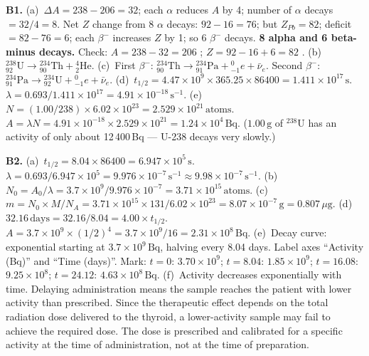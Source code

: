 \textbf{B1.}
(a)~$\Delta A=238-206=32$; each $\alpha$ reduces
$A$ by 4; number of $\alpha$ decays $=32/4=8$.
Net $Z$ change from 8 $\alpha$ decays:
$92-16=76$; but $Z_{Pb}=82$; deficit $=82-76=6$;
each $\beta^-$ increases $Z$ by 1; so 6 $\beta^-$
decays. \textbf{8 alpha and 6 beta-minus decays.}
Check: $A=238-32=206$ \checkmark;
$Z=92-16+6=82$ \checkmark. \quad
(b)~${}^{238}_{92}\text{U}\to
{}^{234}_{90}\text{Th}+{}^{4}_{2}\text{He}$. \quad
(c)~First $\beta^-$:
${}^{234}_{90}\text{Th}\to
{}^{234}_{91}\text{Pa}+{}^{0}_{-1}e+\bar{\nu}_e$.
Second $\beta^-$:
${}^{234}_{91}\text{Pa}\to
{}^{234}_{92}\text{U}+{}^{0}_{-1}e+\bar{\nu}_e$. \quad
(d)~$t_{1/2}=4.47\times10^9\times365.25\times86400
=1.411\times10^{17}\,\text{s}$.
$\lambda=0.693/1.411\times10^{17}
=4.91\times10^{-18}\,\text{s}^{-1}$. \quad
(e)~$N=(1.00/238)\times6.02\times10^{23}
=2.529\times10^{21}\,\text{atoms}$.
$A=\lambda N=4.91\times10^{-18}\times2.529
\times10^{21}=1.24\times10^4\,\text{Bq}$.
($1.00\,\text{g}$ of ${}^{238}$U has an activity of
only about 12\,400\,Bq --- U-238 decays very slowly.)

\textbf{B2.}
(a)~$t_{1/2}=8.04\times86400=6.947\times10^5\,\text{s}$.
$\lambda=0.693/6.947\times10^5
=9.976\times10^{-7}\,\text{s}^{-1}
\approx9.98\times10^{-7}\,\text{s}^{-1}$. \quad
(b)~$N_0=A_0/\lambda=3.7\times10^9/9.976
\times10^{-7}=3.71\times10^{15}\,\text{atoms}$. \quad
(c)~$m=N_0\times M/N_A
=3.71\times10^{15}\times131/6.02\times10^{23}
=8.07\times10^{-7}\,\text{g}=0.807\,\mu\text{g}$. \quad
(d)~$32.16\,\text{days}=32.16/8.04
=4.00\times t_{1/2}$.
$A=3.7\times10^9\times(1/2)^4
=3.7\times10^9/16=2.31\times10^8\,\text{Bq}$. \quad
(e)~Decay curve: exponential starting at
$3.7\times10^9\,\text{Bq}$, halving every 8.04 days.
Label axes ``Activity (Bq)'' and ``Time (days)''.
Mark: $t=0$: $3.70\times10^9$;
$t=8.04$: $1.85\times10^9$;
$t=16.08$: $9.25\times10^8$;
$t=24.12$: $4.63\times10^8\,\text{Bq}$. \quad
(f)~Activity decreases exponentially with time.
Delaying administration means the sample reaches the
patient with lower activity than prescribed. Since
the therapeutic effect depends on the total radiation
dose delivered to the thyroid, a lower-activity sample
may fail to achieve the required dose. The dose is
prescribed and calibrated for a specific activity at
the time of administration, not at the time of
preparation.

